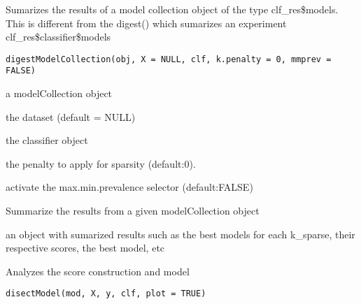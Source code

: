 \documentclass[a4paper]{book}
\begin{document}
%
\begin{Description}
Sumarizes the results of a model collection object of the type clf\_res\$models. This is different from the digest() which sumarizes an experiment clf\_res\$classifier\$models
\end{Description}
%
\begin{Usage}
\begin{verbatim}
digestModelCollection(obj, X = NULL, clf, k.penalty = 0, mmprev = FALSE)
\end{verbatim}
\end{Usage}
%
\begin{Arguments}
\begin{ldescription}
\item[\code{obj:}] a modelCollection object

\item[\code{X:}] the dataset (default = NULL)

\item[\code{clf:}] the classifier object

\item[\code{k.penalty:}] the penalty to apply for sparsity (default:0).

\item[\code{mmprev:}] activate the max.min.prevalence selector (default:FALSE)
\end{ldescription}
\end{Arguments}
%
\begin{Details}
Summarize the results from a given modelCollection object
\end{Details}
%
\begin{Value}
an object with sumarized results such as the best models for each k\_sparse, their respective scores, the best model, etc
\end{Value}
%
\begin{Description}
Analyzes the score construction and model
\end{Description}
%
\begin{Usage}
\begin{verbatim}
disectModel(mod, X, y, clf, plot = TRUE)
\end{verbatim}
\end{Usage}
%
\end{document}
